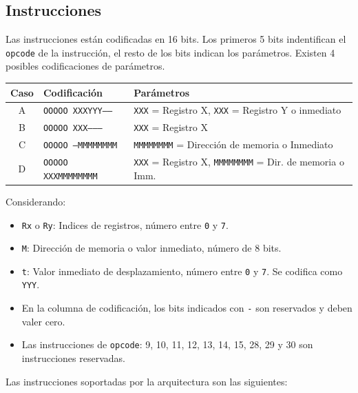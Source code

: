 \documentclass[a4paper,11pt]{article}
\begin{document}
\subsection*{Instrucciones}

Las instrucciones están codificadas en 16 bits.
Los primeros 5 bits indentifican el \texttt{opcode} de la instrucción, el resto de los bits indican los parámetros.
Existen 4 posibles codificaciones de parámetros.

\begin{center}
\begin{tabular}{c|l|l}
Caso & Codificación               & Parámetros \\
\hline
A    & \texttt{OOOOO XXXYYY-----} & \texttt{XXX} = Registro X, \texttt{XXX} = Registro Y o inmediato \\
B    & \texttt{OOOOO XXX--------} & \texttt{XXX} = Registro X\\
C    & \texttt{OOOOO ---MMMMMMMM} & \texttt{MMMMMMMM} = Dirección de memoria o Inmediato\\
D    & \texttt{OOOOO XXXMMMMMMMM} & \texttt{XXX} = Registro X, \texttt{MMMMMMMM} = Dir. de memoria o Imm.\\
\end{tabular}
\end{center}

\noindent Considerando:

\small
\begin{itemize}
  \setlength\itemsep{0em}
 \item \texttt{Rx} o \texttt{Ry}: Indices de registros, número entre \texttt{0} y \texttt{7}.
 \item \texttt{M}: Dirección de memoria o valor inmediato, número de 8 bits.
 \item \texttt{t}: Valor inmediato de desplazamiento, número entre \texttt{0} y \texttt{7}. Se codifica como \texttt{YYY}.
 \item En la columna de codificación, los bits indicados con \texttt{-} son reservados y deben valer cero.
 \item Las instrucciones de \texttt{opcode}: 9, 10, 11, 12, 13, 14, 15, 28, 29 y 30 son instrucciones reservadas.
\end{itemize}
\normalsize

\noindent Las instrucciones soportadas por la arquitectura son las siguientes:
\end{document}
